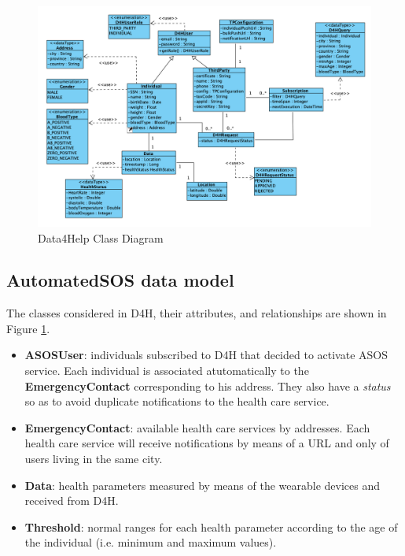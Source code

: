 \documentclass[a4paper, hidelinks, 12pt]{report}
\begin{document}
	\begin{figure}[H]
    		\centering
		\includegraphics[width=1.1\textwidth]{diagrams/d4h_class_diagram.png}
		\caption[Data4Help Class Diagram]{Data4Help Class Diagram}
		\label{fig:Data4Help Class Diagram}
	\end{figure}
	
	\subsection{AutomatedSOS data model}
	 The classes considered in D4H, their attributes, and relationships are shown in Figure \ref{fig:Data4Help Class Diagram}.
	 
	\begin{itemize}
		\item{\textbf{ASOSUser}}: individuals subscribed to D4H that decided to activate ASOS service. Each individual is associated atutomatically to the \textbf{EmergencyContact} corresponding to his address. They also have a \textit{status} so as to avoid duplicate notifications to the health care service. 
		\item{\textbf{EmergencyContact}}: available health care services by addresses.  Each health care service will receive notifications by means of a URL and only of users living in the same city.
		\item {\textbf{Data}}: health parameters measured by means of the wearable devices and received from D4H.
		\item {\textbf{Threshold}}: normal ranges for each health parameter according to the age of the individual (i.e. minimum and maximum values).
	\end{itemize}
	
\end{document}

